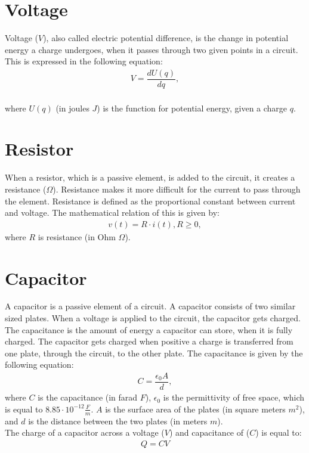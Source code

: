 \section{Voltage}
Voltage ($V$), also called electric potential difference, is the change in potential energy a charge undergoes, when it passes through two given points in a circuit. This is expressed in the following equation:
\begin{align}
	V=\dfrac{dU(q)}{dq},
\end{align}
\\
where $U(q)$ (in joules $J$) is the function for potential energy, given a charge $q$.
\section{Resistor}
When a resistor, which is a passive element, is added to the circuit, it creates a resistance ($\Omega$). Resistance makes it more difficult for the current to pass through the element. Resistance is defined as the proportional constant between current and voltage. The mathematical relation of this is given by:
\begin{align} 
\label{Ohm}
v(t)=R\cdot i(t),  R\geq0,
\end{align}
where $R$ is resistance (in Ohm $\Omega$).
\section{Capacitor}
A capacitor is a passive element of a circuit. A capacitor consists of two similar sized plates. When a voltage is applied to the circuit, the capacitor gets charged. The capacitance is the amount of energy a capacitor can store, when it is fully charged. The capacitor gets charged when positive a charge is transferred from one plate, through the circuit, to the other plate. The capacitance is given by the following equation:
\begin{align*}
C=\dfrac{\epsilon_{0}A}{d},
\end{align*}
where $C$ is the capacitance (in farad $F$), $\epsilon_{0}$ is the permittivity of free space, which is equal to $8.85 \cdot 10^{-12}                                                 \frac{F}{m}$. $A$ is the surface area of the plates (in square meters $m^{2}$), and $d$ is the distance between the two plates (in meters $m$).
\\
The charge of a capacitor across a voltage ($V$) and capacitance of ($C$) is equal to:
\begin{align}
\label{QCV}
Q=CV	
\end{align}

